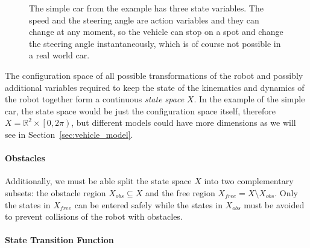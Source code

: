 \begin{figure}
		
	\caption{The simple car from the example has three state variables. The speed and the steering angle are action variables and they can change at any moment, so the vehicle can stop on a spot and change the steering angle instantaneously, which is of course not possible in a real world car.}
\end{figure}

The configuration space of all possible transformations of the robot and possibly additional variables required to keep the state of the kinematics and dynamics of the robot together form a continuous \textit{state space} $X$. In the example of the simple car, the state space would be just the configuration space itself, therefore $X=\mathbb{R}^2\times\left[0,2\pi\right)$, but different models could have more dimensions as we will see in Section~\ref{sec:vehicle_model}.

\paragraph{Obstacles}

Additionally, we must be able split the state space $X$ into two complementary subsets: the obstacle region $X_{obs}\subseteq X$ and the free region $X_{free}=X\setminus X_{obs}$. Only the states in $X_{free}$ can be entered safely while the states in $X_{obs}$ must be avoided to prevent collisions of the robot with obstacles.

\paragraph{State Transition Function}

